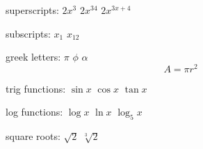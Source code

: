 \documentclass[12pt]{article}
\begin{document}
superscripts: $2x^3$ $2x^{34}$ $2x^{3x+4}$

subscripts: $x_1$ $x_{12}$

greek letters: $\pi$ $\phi$ $\alpha$
$$A = \pi r^2 $$

trig functions: $\sin{x}$ $\cos{x}$ $\tan{x}$

log functions: $\log{x}$ $\ln{x}$ $\log_5{x}$

square roots: $\sqrt{2}$ $\sqrt[3]{2}$
\end{document}
